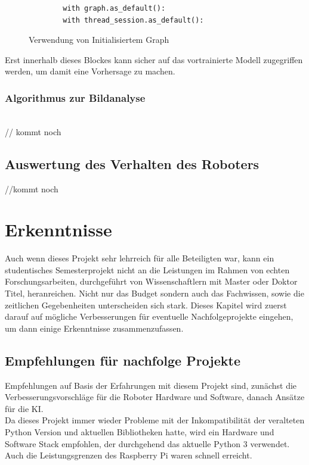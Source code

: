 \documentclass[conference]{IEEEtran}
\begin{document}
	\begin{figure}
		\centering
		\begin{verbatim}
		with graph.as_default():
		with thread_session.as_default():
		\end{verbatim}
		\label{with}
		\caption{Verwendung von Initialisiertem Graph}
	\end{figure}
	
	
	Erst innerhalb dieses Blockes kann sicher auf das vortrainierte Modell zugegriffen werden, um damit eine Vorhersage zu machen.
	\subsubsection{Algorithmus zur Bildanalyse }
	\noindent \\
	// kommt noch 
	\subsection {Auswertung des Verhalten des Roboters}	%
	//kommt noch
	
	
	\section{Erkenntnisse }
	Auch wenn dieses Projekt sehr lehrreich für alle Beteiligten war, kann ein studentisches Semesterprojekt nicht an die Leistungen im Rahmen von echten Forschungsarbeiten, durchgeführt von Wissenschaftlern mit Master oder Doktor Titel, heranreichen. Nicht nur das Budget sondern auch das Fachwissen, sowie die zeitlichen Gegebenheiten unterscheiden sich stark. Dieses Kapitel wird zuerst darauf auf mögliche Verbesserungen für eventuelle Nachfolgeprojekte eingehen, um dann einige Erkenntnisse zusammenzufassen. 
	
	\subsection{Empfehlungen für nachfolge Projekte}
	
	Empfehlungen auf Basis der Erfahrungen mit diesem Projekt sind, zunächst die Verbesserungsvorschläge für die Roboter Hardware und Software, danach Ansätze für die KI.\\
	Da dieses Projekt immer wieder Probleme mit der Inkompatibilität der veralteten Python Version und aktuellen Bibliotheken hatte, wird ein Hardware und Software Stack empfohlen, der durchgehend das aktuelle Python 3 verwendet. Auch die Leistungsgrenzen des Raspberry Pi waren schnell erreicht. \\
	
\end{document}
